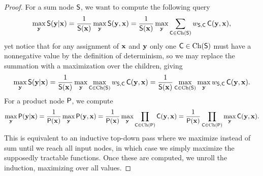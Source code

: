 \det*
\begin{proof}
  \label{proof:det}
  For a sum node $\Sum$, we want to compute the following query
  \begin{equation*}
    \max_{\set{y}}\Sum(\set{y}|\set{x})=\frac{1}{\Sum(\set{x})}\max_{\set{y}}\Sum(\set{y},\set{x})
    =\frac{1}{\Sum(\set{x})}\max_{\set{y}}\sum_{\Child\in\Ch(\Sum)}w_{\Sum,\Child}\Child(\set{y},\set{x}),
  \end{equation*}
  yet notice that for any assignment of $\set{x}$ and $\set{y}$ only one $\Child\in\Ch(\Sum)$ must
  have a nonnegative value by the definition of determinism, so we may replace the summation with
  a maximization over the children, giving
  \begin{equation*}
    \max_{\set{y}}\Sum(\set{y}|\set{x})=\frac{1}{\Sum(\set{x})}\max_{\set{y}}\max_{\Child\in\Ch(\Sum)}w_{\Sum,\Child}\Child(\set{y},\set{x})
    =\frac{1}{\Sum(\set{x})}\max_{\Child\in\Ch(\Sum)}\max_{\set{y}}w_{\Sum,\Child}\Child(\set{y},\set{x}).
  \end{equation*}
  For a product node $\Prod$, we compute
  \begin{align*}
    \max_{\set{y}}\Prod(\set{y}|\set{x})=\frac{1}{\Prod(\set{x})}\max_{\set{y}}\Prod(\set{y},\set{x})
    =\frac{1}{\Prod(\set{x})}\max_{\set{y}}\prod_{\Child\in\Ch(\Prod)}\Child(\set{y},\set{x})
    =\frac{1}{\Prod(\set{x})}\prod_{\Child\in\Ch(\Prod)}\max_{\set{y}}\Child(\set{y},\set{x}).
  \end{align*}
  This is equivalent to an inductive top-down pass where we maximize instead of sum until we reach
  all input nodes, in which case we simply maximize the supposedly tractable functions. Once these
  are computed, we unroll the induction, maximizing over all values.
\end{proof}

